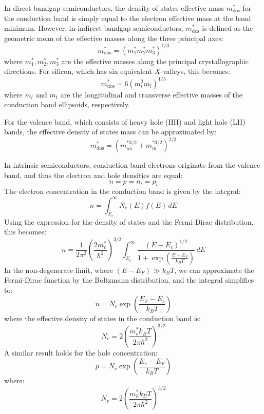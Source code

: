 In direct bandgap semiconductors, the density of states effective mass \( m^*_{\text{dos}} \) for the conduction band is simply equal to the electron effective mass at the band minimum. However, in indirect bandgap semiconductors, \( m^*_{\text{dos}} \) is defined as the geometric mean of the effective masses along the three principal axes:
\begin{equation}
	m^*_{\text{dos}} = \left( m_1^* m_2^* m_3^* \right)^{1/3}
\end{equation}
\noindent
where \( m_1^*, m_2^*, m_3^* \) are the effective masses along the principal crystallographic directions. For silicon, which has six equivalent \( X \)-valleys, this becomes:
\begin{equation}
	m^*_{\text{dos}} = 6 \left( m_t^2 m_l \right)^{1/3}
\end{equation}
\noindent
where \( m_l \) and \( m_t \) are the longitudinal and transverse effective masses of the conduction band ellipsoids, respectively.

For the valence band, which consists of heavy hole (HH) and light hole (LH) bands, the effective density of states mass can be approximated by:
\begin{equation}
	m^*_{\text{dos}} = \left( m_{\text{hh}}^{*3/2} + m_{\text{lh}}^{*3/2} \right)^{2/3}
\end{equation}

In intrinsic semiconductors, conduction band electrons originate from the valence band, and thus the electron and hole densities are equal:
\begin{equation*}
	n = p = n_i = p_i
\end{equation*}
The electron concentration in the conduction band is given by the integral:
\begin{equation}
	n = \int_{E_c}^{\infty} N_e(E) f(E) \, dE
\end{equation}
\noindent
Using the expression for the density of states and the Fermi-Dirac distribution, this becomes:
\begin{equation}
	n = \frac{1}{2\pi^2} \left( \frac{2 m_e^*}{\hbar^2} \right)^{3/2} \int_{E_c}^{\infty} \frac{(E - E_c)^{1/2}}{1 + \exp\left( \frac{E - E_F}{k_B T} \right)} \, dE
\end{equation}
\noindent
In the non-degenerate limit, where \( (E - E_F) \gg k_B T \), we can approximate the Fermi-Dirac function by the Boltzmann distribution, and the integral simplifies to:
\begin{equation}
	n = N_c \exp \left( \frac{E_F - E_c}{k_B T} \right)
\end{equation}
\noindent
where the effective density of states in the conduction band is:
\begin{equation}
	N_c = 2 \left( \frac{m_e^* k_B T}{2\pi \hbar^2} \right)^{3/2}
\end{equation}
A similar result holds for the hole concentration:
\begin{equation}
	p = N_v \exp \left( \frac{E_v - E_F}{k_B T} \right)
\end{equation}
\noindent
where:
\begin{equation}
	N_v = 2 \left( \frac{m_h^* k_B T}{2\pi \hbar^2} \right)^{3/2}
\end{equation}

